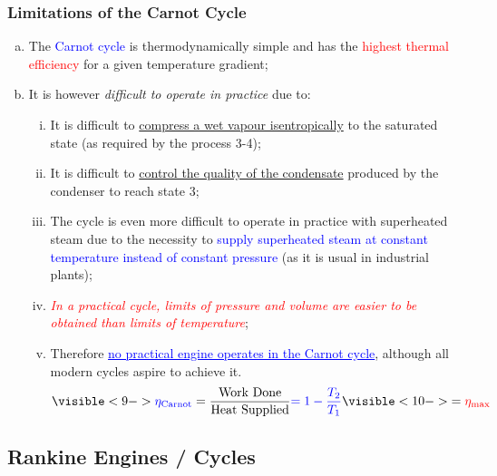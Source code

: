 \documentclass[10pt,compress]{beamer}
\newcommand{\frc}{\displaystyle\frac}
\newcommand{\red}{\textcolor{red}}
\newcommand{\blue}{\textcolor{blue}}
\begin{document}
\begin{frame}
 \frametitle{Limitations of the Carnot Cycle}
 \begin{enumerate}[(a)]
  \item <1-> The \blue{Carnot cycle} is thermodynamically simple and has the \red{highest thermal efficiency} for a given temperature gradient;
  \item <2-> It is however {\it difficult to operate in practice} due to:
  \begin{enumerate}[(i)] %
   \item <3-> It is difficult to \underline{compress a wet vapour isentropically} to the saturated state (as required by the process 3-4);
   \item <4-> It is difficult to \underline{control the quality of the condensate} produced by the condenser to reach state 3;
   \item <6-> The cycle is even more difficult to operate in practice with superheated steam due to the necessity to \blue{supply superheated steam at constant temperature instead of constant pressure} (as it is usual in industrial plants);
   \item <7-> \red{\it In a practical cycle, limits of pressure and volume are easier to be obtained than limits of temperature}; 
   \item <8-> Therefore \blue{\underline{no practical engine operates in the Carnot cycle}}, although all modern cycles aspire to achieve it.
          \begin{displaymath}
             \visible<9->{\blue{\eta_{\text{Carnot}}} = \frc{\text{Work Done}}{\text{Heat Supplied}}\blue{= 1 - \frc{T_{2}}{T_{1}}}} \visible<10->{ = \bf{\red{\eta_{\text{max}}}}}
          \end{displaymath}
  \end{enumerate}
 \end{enumerate}
 \normalsize
\end{frame}



\subsection{Rankine Engines / Cycles}
\end{document}
